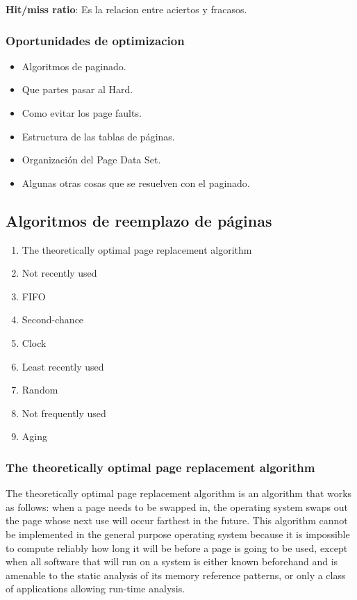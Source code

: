 \documentclass[a4paper, twoside]{article}
\begin{document}
\textbf{Hit/miss ratio}: Es la relacion entre aciertos y fracasos.

\subsubsection{Oportunidades de optimizacion}
\begin{itemize}
	\item Algoritmos de paginado. 
	\item Que partes pasar al Hard.
	\item Como evitar los page faults.
	\item Estructura de las tablas de páginas.
	\item Organización del Page Data Set.
	\item Algunas otras cosas que se resuelven con el paginado.
\end{itemize}

\subsection{Algoritmos de reemplazo de páginas}

\begin{enumerate}
	\item The theoretically optimal page replacement algorithm
	\item Not recently used
	\item FIFO
	\item Second-chance
	\item Clock
	\item Least recently used
	\item Random
	\item Not frequently used
	\item Aging
\end{enumerate}

\subsubsection{The theoretically optimal page replacement algorithm}
The theoretically optimal page replacement algorithm is an algorithm that works as follows: when a page needs to be swapped in, the operating system swaps out the page whose next use will occur farthest in the future.
This algorithm cannot be implemented in the general purpose operating system because it is impossible to compute reliably how long it will be before a page is going to be used, except when all software that will run on a system is either known beforehand and is amenable to the static analysis of its memory reference patterns, or only a class of applications allowing run-time analysis.
\end{document}
